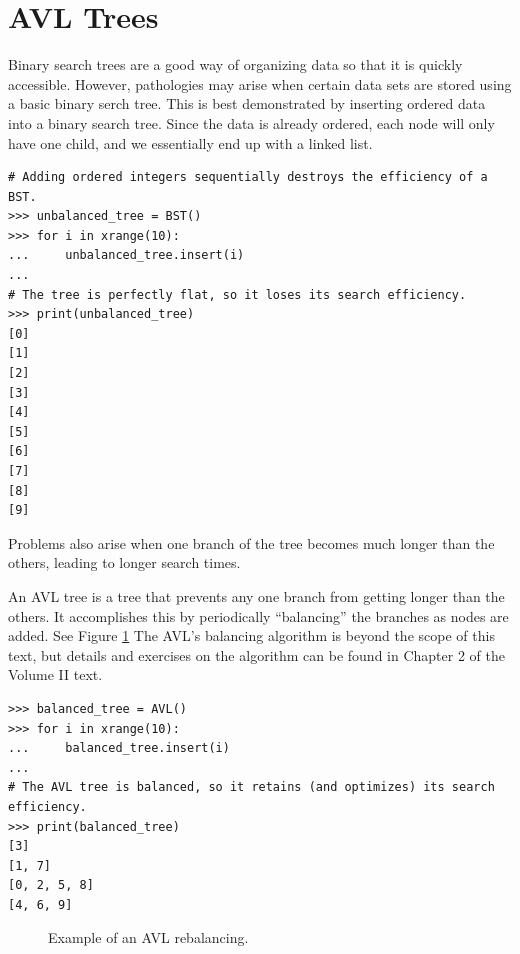 \section*{AVL Trees}

Binary search trees are a good way of organizing data so that it is quickly accessible.
However, pathologies may arise when certain data sets are stored using a basic binary serch tree.
This is best demonstrated by inserting ordered data into a binary search tree.
Since the data is already ordered, each node will only have one child, and we essentially end up with a linked list.

\begin{lstlisting}
# Adding ordered integers sequentially destroys the efficiency of a BST.
>>> unbalanced_tree = BST()
>>> for i in xrange(10):
...     unbalanced_tree.insert(i)
... 
# The tree is perfectly flat, so it loses its search efficiency.
>>> print(unbalanced_tree)
[0]
[1]
[2]
[3]
[4]
[5]
[6]
[7]
[8]
[9]
\end{lstlisting}

Problems also arise when one branch of the tree becomes much longer than the others, leading to longer search times.

An AVL tree is a tree that prevents any one branch from getting longer than the others.
It accomplishes this by periodically ``balancing'' the branches as nodes are added.
See Figure \ref{fig:avl_balance}
The AVL's balancing algorithm is beyond the scope of this text, but details and exercises on the algorithm can be found in Chapter 2 of the Volume II text.

\begin{lstlisting}
>>> balanced_tree = AVL()
>>> for i in xrange(10):
...     balanced_tree.insert(i)
... 
# The AVL tree is balanced, so it retains (and optimizes) its search efficiency.
>>> print(balanced_tree)
[3]
[1, 7]
[0, 2, 5, 8]
[4, 6, 9]
\end{lstlisting}

\begin{figure}
\caption{Example of an AVL rebalancing.}
\label{fig:avl_balance}
\end{figure}

